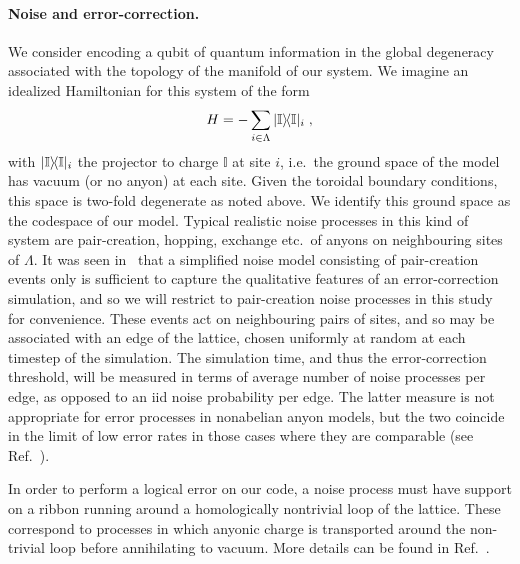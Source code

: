 \documentclass[aps, prl, letterpaper, twocolumn, superscriptaddress, notitlepage, 10pt]{revtex4-1}
\begin{document}
\paragraph{Noise and error-correction.}

	We consider encoding a qubit of quantum information in the global degeneracy associated with the topology of the manifold of our system. We imagine an idealized Hamiltonian for this system of the form
	\begin{align}
		H=-\sum_{i\in \Lambda}|{\mathbb{I}}\rangle\!\langle{\mathbb{I}}|_i\;,\label{e:hamiltonian}
	\end{align}
with $|{\mathbb{I}}\rangle\!\langle{\mathbb{I}}|_i$ the projector to charge $\mathbb{I}$ at site $i$, i.e.~the ground space of the model has vacuum (or no anyon) at each site. Given the toroidal boundary conditions, this space is two-fold degenerate as noted above. We identify this ground space as the codespace of our model. Typical realistic noise processes in this kind of system are pair-creation, hopping, exchange etc.~of anyons on neighbouring sites of $\Lambda$. It was seen in~\cite{Brell2013} that a simplified noise model consisting of pair-creation events only is sufficient to capture the qualitative features of an error-correction simulation, and so we will restrict to pair-creation noise processes in this study for convenience. These events act on neighbouring pairs of sites, and so may be associated with an edge of the lattice, chosen uniformly at random at each timestep of the simulation. The simulation time, and thus the error-correction threshold, will be measured in terms of average number of noise processes per edge, as opposed to an iid noise probability per edge. The latter measure is not appropriate for error processes in nonabelian anyon models, but the two coincide in the limit of low error rates in those cases where they are comparable (see Ref.~\cite{Brell2013}).

	In order to perform a logical error on our code, a noise process must have support on a ribbon running around a homologically nontrivial loop of the lattice. These correspond to processes in which anyonic charge is transported around the non-trivial loop before annihilating to vacuum. More details can be found in Ref.~\cite{?}.
\end{document}
